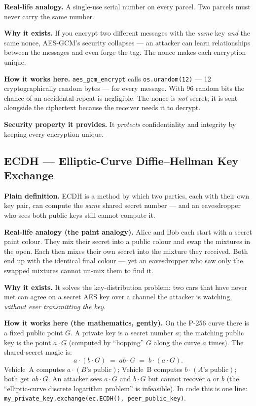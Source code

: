\documentclass[11pt,a4paper]{report}
\begin{document}
\textbf{Real-life analogy.} A single-use serial number on every parcel. Two
parcels must never carry the same number.

\textbf{Why it exists.} If you encrypt two different messages with the \emph{same}
key \emph{and} the same nonce, AES-GCM's security collapses --- an attacker can
learn relationships between the messages and even forge the tag. The nonce makes
each encryption unique.

\textbf{How it works here.} \texttt{aes\_gcm\_encrypt} calls
\texttt{os.urandom(12)} --- 12 cryptographically random bytes --- for every
message. With 96 random bits the chance of an accidental repeat is negligible.
The nonce is \emph{not} secret; it is sent alongside the ciphertext because the
receiver needs it to decrypt.

\textbf{Security property it provides.} It \emph{protects} confidentiality and
integrity by keeping every encryption unique.

\subsection{ECDH --- Elliptic-Curve Diffie--Hellman Key Exchange}
\textbf{Plain definition.} ECDH is a method by which two parties, each with their
own key pair, can compute the \emph{same} shared secret number --- and an
eavesdropper who sees both public keys still cannot compute it.

\textbf{Real-life analogy (the paint analogy).} Alice and Bob each start with a
secret paint colour. They mix their secret into a public colour and swap the
mixtures in the open. Each then mixes their own secret into the mixture they
received. Both end up with the identical final colour --- yet an eavesdropper who
saw only the swapped mixtures cannot un-mix them to find it.

\textbf{Why it exists.} It solves the key-distribution problem: two cars that
have never met can agree on a secret AES key over a channel the attacker is
watching, \emph{without ever transmitting the key}.

\textbf{How it works here (the mathematics, gently).} On the P-256 curve there is
a fixed public point $G$. A private key is a secret number $a$; the matching
public key is the point $a\cdot G$ (computed by ``hopping'' $G$ along the curve
$a$ times). The shared-secret magic is:
\[
a\cdot(b\cdot G)\;=\;ab\cdot G\;=\;b\cdot(a\cdot G).
\]
Vehicle~A computes $a\cdot(B\text{'s public})$; Vehicle~B computes
$b\cdot(A\text{'s public})$; both get $ab\cdot G$. An attacker sees $a\cdot G$
and $b\cdot G$ but cannot recover $a$ or $b$ (the ``elliptic-curve discrete
logarithm problem'' is infeasible). In code this is one line:
\texttt{my\_private\_key.exchange(ec.ECDH(), peer\_public\_key)}.
\end{document}

